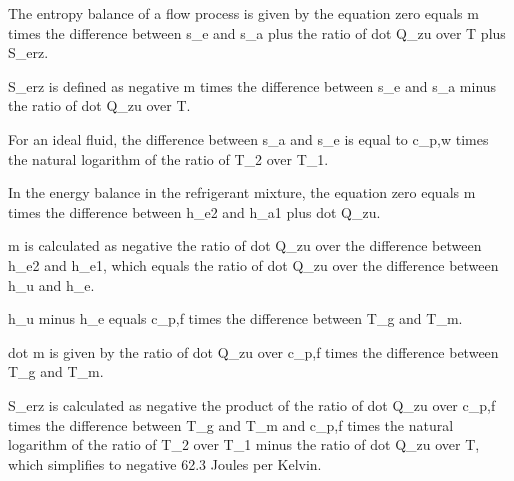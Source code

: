 The entropy balance of a flow process is given by the equation zero equals m times the difference between s_e and s_a plus the ratio of dot Q_zu over T plus S_erz. 

S_erz is defined as negative m times the difference between s_e and s_a minus the ratio of dot Q_zu over T.

For an ideal fluid, the difference between s_a and s_e is equal to c_p,w times the natural logarithm of the ratio of T_2 over T_1.

In the energy balance in the refrigerant mixture, the equation zero equals m times the difference between h_e2 and h_a1 plus dot Q_zu.

m is calculated as negative the ratio of dot Q_zu over the difference between h_e2 and h_e1, which equals the ratio of dot Q_zu over the difference between h_u and h_e.

h_u minus h_e equals c_p,f times the difference between T_g and T_m.

dot m is given by the ratio of dot Q_zu over c_p,f times the difference between T_g and T_m.

S_erz is calculated as negative the product of the ratio of dot Q_zu over c_p,f times the difference between T_g and T_m and c_p,f times the natural logarithm of the ratio of T_2 over T_1 minus the ratio of dot Q_zu over T, which simplifies to negative 62.3 Joules per Kelvin.